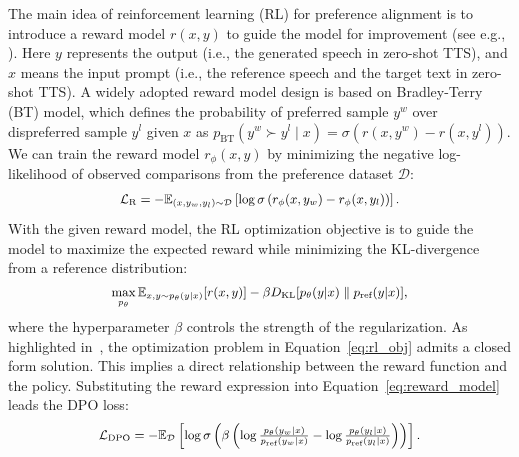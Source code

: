 \documentclass[11pt]{article}
\begin{document}
The main idea of reinforcement learning (RL) for preference alignment is to introduce a reward model  $r(x,y)$ to guide the model for improvement (see e.g., \citep{li2023rema4}). Here $y$ represents the output (i.e., the generated speech in zero-shot TTS), and $x$ means the input prompt (i.e., the reference speech and the target text in zero-shot TTS).
A widely adopted reward model design is based on Bradley-Terry (BT) model, which defines the probability of preferred sample $y^w$ over dispreferred sample $y^l$ given $x$ as $p_\text{BT}(y^w \succ y^l \mid x) = \sigma (r(x, y^w) - r(x, y^l))$.
We can train the reward model \( r_\phi(x, y) \) by minimizing the negative log-likelihood of observed comparisons from the preference dataset $\mathcal{D}$:
\begin{equation}
    {\small
    \begin{aligned}
 \mathcal{L}_\text{R} = -\mathbb{E}_{(x, y_w, y_l) \sim \mathcal{D}} \left[ \log \sigma\left(r_\phi(x, y_w) - r_\phi(x, y_l)\right) \right].
    \end{aligned}
    }
\label{eq:reward_model}
\end{equation}
With the given reward model, the RL optimization objective is to guide the model to maximize the expected reward while minimizing the KL-divergence from a reference distribution:
\begin{equation}
    {\small
    \begin{aligned}
  \max_{p_\theta} \mathbb{E}_{x, y \sim p_\theta(y | x)} [r(x, y)] - \beta D_{\text{KL}} [p_\theta(y | x) \parallel p_{\text{ref}}(y | x)],  
  \end{aligned}
  }
\label{eq:rl_obj}
\end{equation}
where the hyperparameter $\beta$ controls the strength of the regularization.
As highlighted in~\citet{dpo}, the optimization problem in Equation~\ref{eq:rl_obj} admits a closed form solution. This implies a direct relationship between the reward function and the policy. Substituting the reward expression into Equation~\ref{eq:reward_model} leads the DPO loss:
\begin{equation}
    {\small
    \begin{aligned}
\mathcal{L}_\text{DPO} = -\mathbb{E}_{\mathcal{D}} \left[ \log \sigma\left( \beta \left( \log \tfrac{p_\theta(y_w | x)}{p_{\text{ref}}(y_w | x)} - \log \tfrac{p_\theta(y_l | x)}{p_{\text{ref}}(y_l | x)} \right) \right) \right].
    \end{aligned}
    }
\label{eq:dpo_ar}
\end{equation}
\end{document}
